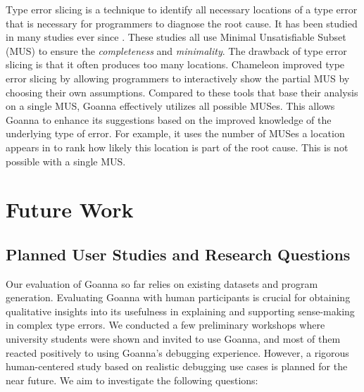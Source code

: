 \documentclass[pdflatex,lineno,sn-nature,Numbered]{sn-jnl}%
\begin{document}
Type error slicing \cite{Haack2004-fr} is a technique to identify all necessary locations of a type error that is necessary for programmers to diagnose the root cause. It has been studied in many studies ever since \cite{Tip2001-qn, Heeren2003-kd}. These studies all use Minimal Unsatisfiable Subset (MUS) to ensure the \textit{completeness} and \textit{minimality}. The drawback of type error slicing is that it often produces too many locations.  Chameleon \cite{Stuckey2003-pz,Fu2021-xd} improved type error slicing by allowing programmers to interactively show the partial MUS by choosing their own assumptions. Compared to these tools that base their analysis on a single MUS, Goanna effectively utilizes all possible MUSes. This allows Goanna to enhance its suggestions based on the improved knowledge of the underlying type of error. For example, it uses the number of MUSes a location appears in to rank how likely this location is part of the root cause. This is not possible with a single MUS.  

\section{Future Work}\label{sec:future-work}

\subsection{Planned User Studies and Research Questions}

Our evaluation of Goanna so far relies on existing datasets and program generation. Evaluating Goanna with human participants is crucial for obtaining qualitative insights into its usefulness in explaining and supporting sense-making in complex type errors. We conducted a few preliminary workshops where university students were shown and invited to use Goanna, and most of them reacted positively to using Goanna's debugging experience. However, a rigorous human-centered study based on realistic debugging use cases is planned for the near future. We aim to investigate the following questions:

\end{document}
